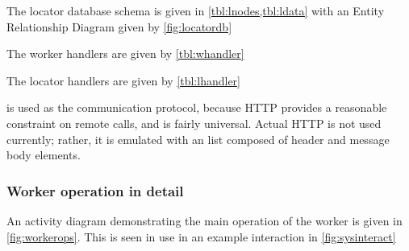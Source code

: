 



The locator database schema is given in \cref{tbl:lnodes,tbl:ldata} with an Entity Relationship Diagram given by \cref{fig:locatordb}




The worker handlers are given by \cref{tbl:whandler}


The locator handlers are given by \cref{tbl:lhandler}


 is used as the communication protocol, because HTTP provides a reasonable constraint on remote calls, and is fairly universal.
Actual HTTP is not used currently; rather, it is emulated with an \R list composed of header and message body elements.

\subsubsection{Worker operation in detail}

An activity diagram demonstrating the main operation of the worker is given in \cref{fig:workerops}.
This is seen in use in an example interaction in \cref{fig:sysinteract}


